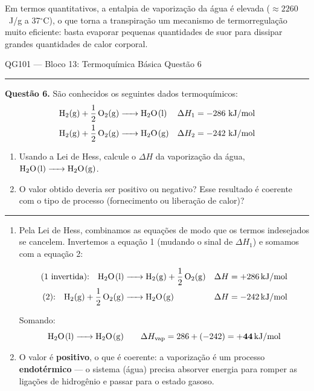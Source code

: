 \documentclass[10pt,a4paper]{article}
\newcommand{\oC}{$^\circ$C}
\newcommand{\questaoheader}[1]{%
  \begin{center}
  {\small\sffamily QG101 --- Bloco 13: Termoquímica Básica
  \hfill Questão #1}
  \end{center}
  \vspace{-0.3cm}
  \noindent\rule{\textwidth}{0.6pt}
  \vspace{0.1cm}
}
\newcommand{\resolucaosep}{%
  \vspace{0.4cm}
  \noindent\rule{\textwidth}{0.4pt}
  \vspace{0.1cm}

  \noindent{\bf Resolução:}
  \vspace{0.2cm}
}
\begin{document}
Em termos quantitativos, a entalpia de vaporização da água é elevada
($\approx 2260$~J/g a 37\oC), o que torna a transpiração um mecanismo
de termorregulação muito eficiente: basta evaporar pequenas quantidades
de suor para dissipar grandes quantidades de calor corporal.

\clearpage

\questaoheader{6}

\noindent\textbf{Questão 6.}
São conhecidos os seguintes dados termoquímicos:
\begin{align*}
\ce{H2(g) + 1/2 O2(g) &-> H2O(l)} &\Delta H_1 &= -286~\text{kJ/mol}\\
\ce{H2(g) + 1/2 O2(g) &-> H2O(g)} &\Delta H_2 &= -242~\text{kJ/mol}
\end{align*}
\begin{enumerate}
  \item Usando a Lei de Hess, calcule o $\Delta H$ da vaporização da água,
        $\ce{H2O(l) -> H2O(g)}$.
  \item O valor obtido deveria ser positivo ou negativo? Esse resultado é
        coerente com o tipo de processo (fornecimento ou liberação de
        calor)?
\end{enumerate}

\resolucaosep

\begin{enumerate}
  \item Pela Lei de Hess, combinamos as equações de modo que os termos
        indesejados se cancelem. Invertemos a equação 1 (mudando o sinal
        de $\Delta H_1$) e somamos com a equação 2:

        \begin{align*}
          \text{(1 invertida):}\quad
          \ce{H2O(l) &-> H2(g) + 1/2 O2(g)}
          &\Delta H &= +286\,\text{kJ/mol}\\
          \text{(2):}\quad
          \ce{H2(g) + 1/2 O2(g) &-> H2O(g)}
          &\Delta H &= -242\,\text{kJ/mol}
        \end{align*}

        Somando:
        \[
          \ce{H2O(l) -> H2O(g)}
          \qquad
          \Delta H_{\text{vap}} = 286 + (-242) = \mathbf{+44\,\text{kJ/mol}}
        \]

  \item O valor é \textbf{positivo}, o que é coerente: a vaporização é um
        processo \textbf{endotérmico} --- o sistema (água) precisa absorver
        energia para romper as ligações de hidrogênio e passar para o
        estado gasoso.
\end{enumerate}
\end{document}
